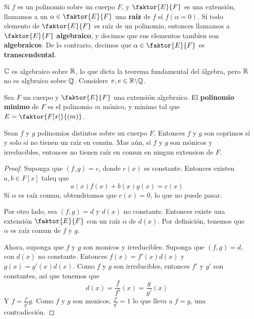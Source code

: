 \begin{definition}
    S\'i $f$ es un polinomio sobre un cuerpo $F$, y $\faktor{E}{F}$ es una
    extensi\'on, llamamos a un $\alpha \in \faktor{E}{F}$ una \textbf{ra\'iz} de
    $f$ s\'i  $f(\alpha=0)$. S\'i todo elemento de $\faktor{E}{F}$ es ra\'iz de
    un polinomio, entonces llamamos a $\faktor{E}{F}$ \textbf{algebraico}, y
    decimos que sus elementos tambien son \textbf{algebraicos}. De lo contrario,
    decimos que $\alpha \in \faktor{E}{F}$ es \textbf{transcendental}.
\end{definition}

\begin{example}\label{}
    $\mathbb{C}$ es algebraico sobre $\mathbb{R}$, lo que dicta la teorema fundamental del
    \'algebra, pero $\mathbb{R}$ no es algbraico sobre $\mathbb{Q}$. Considere $\pi,e \in
    \mathbb{R}\backslash\mathbb{Q}$.
\end{example}

\begin{definition}
    Sea $F$ un cuerpo y  $\faktor{E}{F}$ una extensi\'on algebraico. El
    \textbf{polinomio minimo} de $F$ es el polinomio $m$ m\'onico, y minimo tal
    que  $E=\faktor{F[x]}{(m)}$.
\end{definition}

\begin{lemma}\label{19.80}
    Sean $f$ y $g$ polinomios distintos sobre un cuerpo $F$. Entonces $f$ y $g$
    son coprimos s\'i y solo s\'i no tienen un ra\'iz en com\'un. Mas a\'un,
    s\'i $f$ y  $g$ son m\'onicos y irreducibles, entonces no tienen ra\'iz en
    comun en ningun extension de  $F$.
\end{lemma}
\begin{proof}
    Suponga que $(f,g)=c$, donde $c(x)$ es constante. Entonces existen $a,b \in
    F[x]$ taleq que
    \begin{equation*}
        a(x)f(x)+b(x)g(x)=c(x)
    \end{equation*}
    S\'i $\alpha$ es ra\'iz comun, obtendriamos que  $c(x)=0$, lo que no puede
    pasar.

    Por otro lado, sea $(f,g)=d$ y $d(x)$ no constante. Entonces existe una
    extensi\'on $\faktor{E}{F}$  con un ra\'iz $\alpha$ de  $d(x)$. Por
    definici\'on, tenemos que $\alpha$ es ra\'iz comun de $f$ y  $g$.

    Ahora, suponga que  $f$ y $g$ son monicos y irreducibles. Suponga que
    $(f,g)=d$, con $d(x)$ no constante. Entonces $f(x)=f'(x)d(x)$ y
    $g(x)=g'(x)d(x)$. Como $f$ y $g$ son irreducibles, entonces $f'$ y  $g'$ son
    constantes, as\'i que tenemos que
    \begin{equation*}
        d(x)=\frac{f}{f'}(x)=\frac{g}{g'}(x)
    \end{equation*}
    Y $f=\frac{f'}{g'}g$. Como $f$ y $g$ son monicos, $\frac{f'}{g'}=1$ lo que
    lleva a $f=g$, una contradicci\'on.
\end{proof}

